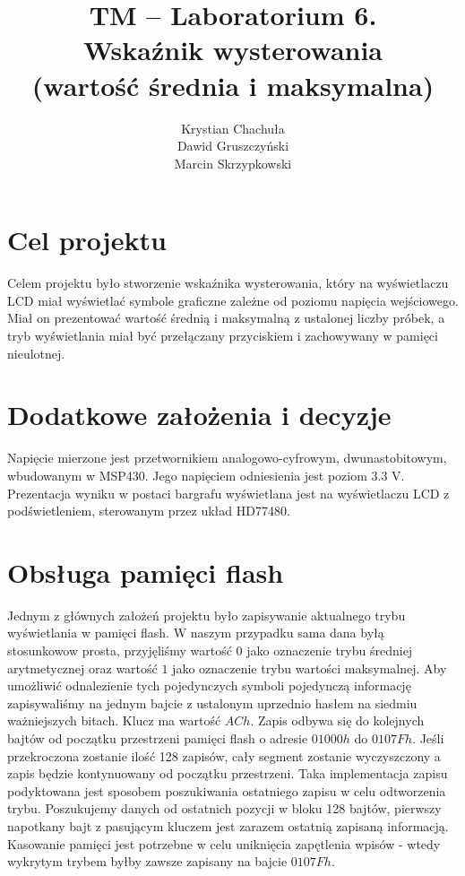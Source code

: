 \documentclass[fleqn]{article}
\title{TM -- Laboratorium 6. \\ \large Wskaźnik wysterowania \\ (wartość średnia i maksymalna)}
\author{Krystian Chachuła \\ Dawid Gruszczyński \\ Marcin Skrzypkowski}
\begin{document}
\maketitle

\setcounter{page}{0}
\thispagestyle{empty}

\pagebreak

\setcounter{page}{1}

\section{Cel projektu}

Celem projektu było stworzenie wskaźnika wysterowania, który na wyświetlaczu LCD miał wyświetlać symbole graficzne zależne od poziomu napięcia wejściowego. Miał on prezentować wartość średnią i maksymalną z ustalonej liczby próbek, a tryb wyświetlania miał być przełączany przyciskiem i zachowywany w pamięci nieulotnej.

\section{Dodatkowe założenia i decyzje}

Napięcie mierzone jest przetwornikiem analogowo-cyfrowym, dwunastobitowym, wbudowanym w MSP430. Jego napięciem odniesienia jest poziom 3.3 V. Prezentacja wyniku w postaci bargrafu wyświetlana jest na wyświetlaczu LCD z podświetleniem, sterowanym przez układ HD77480.


\section{Obsługa pamięci flash}
Jednym z głównych założeń projektu było zapisywanie aktualnego trybu wyświetlania w pamięci flash. W naszym przypadku sama dana byłą stosunkowow prosta, przyjęliśmy wartość $0$ jako oznaczenie trybu średniej arytmetycznej oraz wartość $1$ jako oznaczenie trybu wartości maksymalnej. Aby umożliwić odnalezienie tych pojedynczych symboli pojedynczą informację zapisywaliśmy na jednym bajcie z ustalonym uprzednio hasłem na siedmiu ważniejszych bitach. Klucz ma wartość $ACh$. Zapis odbywa się do kolejnych bajtów od początku przestrzeni pamięci flash o adresie $01000h$ do $0107Fh$. Jeśli przekroczona zostanie ilość 128 zapisów, cały segment zostanie wyczyszczony a zapis będzie kontynuowany od początku przestrzeni. Taka implementacja zapisu podyktowana jest sposobem poszukiwania ostatniego zapisu w celu odtworzenia trybu. Poszukujemy danych od ostatnich pozycji w bloku 128 bajtów, pierwszy napotkany bajt z pasującym kluczem jest zarazem ostatnią zapisaną informacją. Kasowanie pamięci jest potrzebne w celu uniknięcia zapętlenia wpisów - wtedy wykrytym trybem byłby zawsze zapisany na bajcie $0107Fh$.
\end{document}
